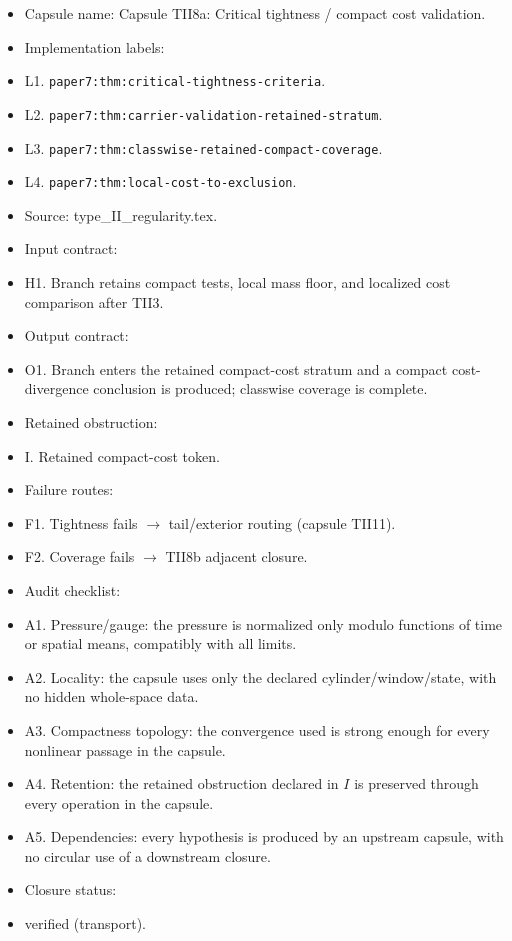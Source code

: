 \documentclass[11pt]{amsart}
\begin{document}
\begin{itemize}
  \item Capsule name: Capsule TII8a: Critical tightness / compact cost validation.
  \item Implementation labels:
  \item L1. \texttt{paper7:thm:critical-tightness-criteria}.
  \item L2. \texttt{paper7:thm:carrier-validation-retained-stratum}.
  \item L3. \texttt{paper7:thm:classwise-retained-compact-coverage}.
  \item L4. \texttt{paper7:thm:local-cost-to-exclusion}.
  \item Source: type\_II\_regularity.tex.
  \item Input contract:
  \item H1. Branch retains compact tests, local mass floor, and localized cost comparison after TII3.
  \item Output contract:
  \item O1. Branch enters the retained compact-cost stratum and a compact cost- divergence conclusion is produced; classwise coverage is complete.
  \item Retained obstruction:
  \item I. Retained compact-cost token.
  \item Failure routes:
  \item F1. Tightness fails $\to$ tail/exterior routing (capsule TII11).
  \item F2. Coverage fails $\to$ TII8b adjacent closure.
  \item Audit checklist:
  \item A1. Pressure/gauge: the pressure is normalized only modulo functions of time or spatial means, compatibly with all limits.
  \item A2. Locality: the capsule uses only the declared cylinder/window/state, with no hidden whole-space data.
  \item A3. Compactness topology: the convergence used is strong enough for every nonlinear passage in the capsule.
  \item A4. Retention: the retained obstruction declared in $I$ is preserved through every operation in the capsule.
  \item A5. Dependencies: every hypothesis is produced by an upstream capsule, with no circular use of a downstream closure.
  \item Closure status:
  \item verified (transport).
\end{itemize}
\end{document}
